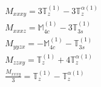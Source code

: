 \documentclass[fleqn,8pt,landscape]{jsarticle}
\begin{document}
\begin{align*}
& M_{xxxy} = 3 \mathbb{T}_{z}^{(1)} - 3 \mathbb{T}_{z}^{\alpha(1)} \\
& M_{xxxz} = \mathbb{M}_{4c}^{(1)} - 3 \mathbb{T}_{3s}^{(1)} \\
& M_{yyzx} = - \mathbb{M}_{4c}^{(1)} - \mathbb{T}_{3s}^{(1)} \\
& M_{zzxy} = \mathbb{T}_{z}^{(1)} + 4 \mathbb{T}_{z}^{\alpha(1)} \\
& \frac{M_{xxxy}}{3} = \mathbb{T}_{z}^{(1)} - \mathbb{T}_{z}^{\alpha(1)}
\end{align*}
\end{document}
